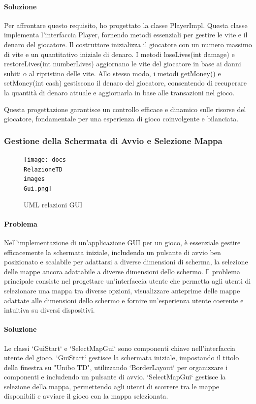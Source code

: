 \documentclass[a4paper,12pt]{report}
\begin{document}
\paragraph{Soluzione} Per affrontare questo requisito, ho progettato la classe PlayerImpl. Questa classe implementa l'interfaccia Player, fornendo metodi essenziali per gestire le vite e il denaro del giocatore. Il costruttore inizializza il giocatore con un numero massimo di vite e un quantitativo iniziale di denaro. I metodi loseLives(int damage) e restoreLives(int numberLives) aggiornano le vite del giocatore in base ai danni subiti o al ripristino delle vite. Allo stesso modo, i metodi getMoney() e setMoney(int cash) gestiscono il denaro del giocatore, consentendo di recuperare la quantità di denaro attuale e aggiornarla in base alle transazioni nel gioco.

Questa progettazione garantisce un controllo efficace e dinamico sulle risorse del giocatore, fondamentale per una esperienza di gioco coinvolgente e bilanciata.

\subsubsection{Gestione della Schermata di Avvio e Selezione Mappa}
\begin{figure}[H]
	\centering{}
	\texttt{[image: docs\\RelazioneTD\\images\\Gui.png]}
	\caption{UML relazioni GUI}
	\label{img:Gui}
\end{figure}
\paragraph{Problema} Nell'implementazione di un'applicazione GUI per un gioco, è essenziale gestire efficacemente la schermata iniziale, includendo un pulsante di avvio ben posizionato e scalabile per adattarsi a diverse dimensioni di scherma, la selezione delle mappe ancora adattabile a diverse dimensioni dello schermo. Il problema principale consiste nel progettare un'interfaccia utente che permetta agli utenti di selezionare una mappa tra diverse opzioni, visualizzare anteprime delle mappe adattate alle dimensioni dello schermo e fornire un'esperienza utente coerente e intuitiva su diversi dispositivi.
\paragraph{Soluzione} Le classi `GuiStart` e `SelectMapGui` sono componenti chiave nell'interfaccia utente del gioco. `GuiStart` gestisce la schermata iniziale, impostando il titolo della finestra su "Unibo TD", utilizzando `BorderLayout` per organizzare i componenti e includendo un pulsante di avvio. `SelectMapGui` gestisce la selezione della mappa, permettendo agli utenti di scorrere tra le mappe disponibili e avviare il gioco con la mappa selezionata.
\end{document}
